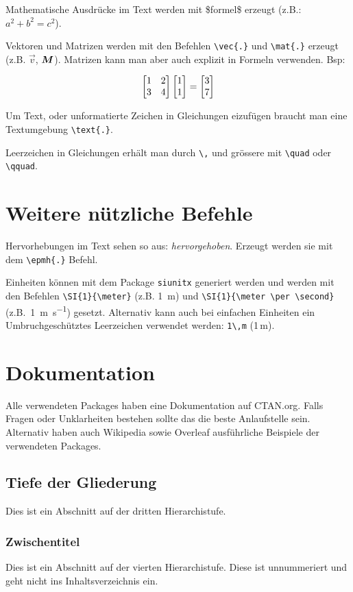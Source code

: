 Mathematische Ausdrücke im Text werden mit \$formel\$ erzeugt (z.B.:
$a^2+b^2=c^2$).

Vektoren und Matrizen werden mit den Befehlen \texttt{\textbackslash vec\{.\}} und \texttt{\textbackslash mat\{.\}} erzeugt (z.B. $\vec{v}$, $\mat{M}$). Matrizen kann man aber auch explizit in Formeln verwenden. Bsp:

\begin{equation}
    \begin{bmatrix}
    1 & 2 \\
    3 & 4 
    \end{bmatrix}
    \begin{bmatrix}
    1 \\
    1
    \end{bmatrix}
    = 
    \begin{bmatrix}
    3 \\
    7
    \end{bmatrix}
    \vspace{0.5cm}
\end{equation}

Um Text, oder unformatierte Zeichen in Gleichungen eizufügen braucht man eine Textumgebung \texttt{\textbackslash text\{.\}}.

Leerzeichen in Gleichungen erhält man durch \texttt{\textbackslash,} und grössere mit
\texttt{\textbackslash quad} oder \texttt{\textbackslash qquad}.


\section{Weitere nützliche Befehle}\label{sec:div}

Hervorhebungen im Text sehen so aus: \emph{hervorgehoben}. Erzeugt
werden sie mit dem \texttt{\textbackslash epmh\{.\}} Befehl.

Einheiten können mit dem Package \texttt{siunitx} generiert werden und werden mit den Befehlen \texttt{\textbackslash SI\{1\}\{\textbackslash meter\}} (z.B. \SI{1}{\meter}) und \texttt{\textbackslash SI\{1\}\{\textbackslash meter \textbackslash per \textbackslash second\}} (z.B.~\SI{1}{\meter\per\second}) gesetzt. Alternativ kann auch bei einfachen Einheiten ein Umbruchgeschütztes Leerzeichen verwendet werden: \texttt{1\textbackslash ,m} (1\,m).

\section{Dokumentation}
Alle verwendeten Packages haben eine Dokumentation auf CTAN.org. Falls Fragen oder Unklarheiten bestehen sollte das die beste Anlaufstelle sein. Alternativ haben auch Wikipedia sowie Overleaf ausführliche Beispiele der verwendeten Packages.

\subsection{Tiefe der Gliederung}
Dies ist ein Abschnitt auf der dritten Hierarchistufe.

\subsubsection{Zwischentitel}
Dies ist ein Abschnitt auf der vierten Hierarchistufe. Diese ist unnummeriert und geht nicht ins Inhaltsverzeichnis ein.